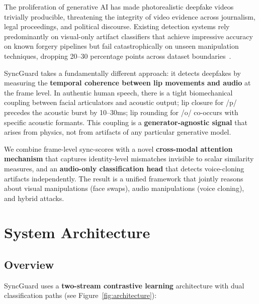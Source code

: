 \documentclass[12pt, letterpaper]{article}
\begin{document}
The proliferation of generative AI has made photorealistic deepfake videos trivially producible, threatening the integrity of video evidence across journalism, legal proceedings, and political discourse. Existing detection systems rely predominantly on visual-only artifact classifiers that achieve impressive accuracy on known forgery pipelines but fail catastrophically on unseen manipulation techniques, dropping 20--30 percentage points across dataset boundaries~\cite{rossler2019, yermakov2026}.

SyncGuard takes a fundamentally different approach: it detects deepfakes by measuring the \textbf{temporal coherence between lip movements and audio} at the frame level. In authentic human speech, there is a tight biomechanical coupling between facial articulators and acoustic output; lip closure for /p/ precedes the acoustic burst by 10--30ms; lip rounding for /o/ co-occurs with specific acoustic formants. This coupling is a \textbf{generator-agnostic signal} that arises from physics, not from artifacts of any particular generative model.

We combine frame-level sync-scores with a novel \textbf{cross-modal attention mechanism} that captures identity-level mismatches invisible to scalar similarity measures, and an \textbf{audio-only classification head} that detects voice-cloning artifacts independently. The result is a unified framework that jointly reasons about visual manipulations (face swaps), audio manipulations (voice cloning), and hybrid attacks.

\section{System Architecture}

\subsection{Overview}

SyncGuard uses a \textbf{two-stream contrastive learning} architecture with dual classification paths (see Figure~\ref{fig:architecture}):
\end{document}
